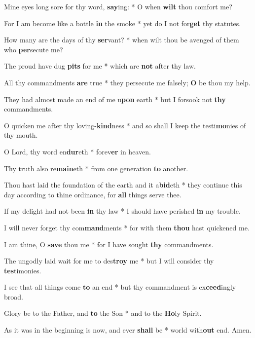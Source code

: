 \begin{multicols}{2}
	Mine eyes long sore for thy word, \textbf{say}ing: * O when \textbf{wilt} thou comfort me?
	
	For I am become like a bottle \textbf{in} the smoke * yet do I not for\textbf{get} thy statutes.
	
	How many are the days of thy \textbf{ser}vant? * when wilt thou be avenged of them who \textbf{per}secute me?
	
	The proud have dug \textbf{pits} for me * which are \textbf{not} after thy law.
	
	All thy commandments \textbf{are} true * they persecute me falsely; \textbf{O} be thou my help.
	
	They had almost made an end of me u\textbf{pon} earth * but I forsook not \textbf{thy} commandments.
	
	O quicken me after thy loving-\textbf{kind}ness * and so shall I keep the testi\textbf{mo}nies of thy mouth.
	
	O Lord, thy word en\textbf{dur}eth * forev\textbf{er} in heaven.
	
	Thy truth also re\textbf{main}eth * from one generation \textbf{to} another.
	
	Thou hast laid the foundation of the earth and it a\textbf{bid}eth * they continue this day according to thine ordinance, for \textbf{all} things serve thee.
	
	If my delight had not been \textbf{in} thy law * I should have perished \textbf{in} my trouble.
	
	I will never forget thy com\textbf{mand}ments * for with them \textbf{thou} hast quickened me.
	
	I am thine, O \textbf{save} thou me * for I have sought \textbf{thy} commandments.
	
	The ungodly laid wait for me to des\textbf{troy} me * but I will consider thy \textbf{tes}timonies.
	
	I see that all things come \textbf{to} an end * but thy commandment is ex\textbf{ceed}ingly broad.
	
	Glory be to the Father, and \textbf{to} the Son * and to the \textbf{Ho}ly Spirit.
	
	As it was in the beginning is now, and ever \textbf{shall} be * world with\textbf{out} end. Amen.
\end{multicols}